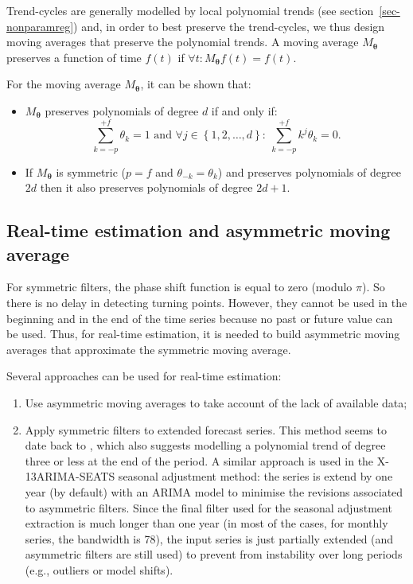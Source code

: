 \documentclass[
]{article}
\providecommand{\tightlist}{%
  \setlength{\itemsep}{0pt}\setlength{\parskip}{0pt}}\usepackage{longtable,booktabs,array}
\newcommand\1{\mathds{1}}
\begin{document}
Trend-cycles are generally modelled by local polynomial trends (see
section~\ref{sec-nonparamreg}) and, in order to best preserve the
trend-cycles, we thus design moving averages that preserve the
polynomial trends. A moving average \(M_{\boldsymbol\theta}\) preserves
a function of time \(f(t)\) if
\(\forall t:M_{\boldsymbol\theta} f(t)=f(t)\).

For the moving average \(M_{\boldsymbol\theta}\), it can be shown that:

\begin{itemize}
\tightlist
\item
  \(M_{\boldsymbol\theta}\) preserves polynomials of degree \(d\) if and
  only if: \[
  \sum_{k=-p}^{+f}\theta_k=1
   \text{ and }
  \forall j \in \left\{1,2,\dots,d\right\}:\:
  \sum_{k=-p}^{+f}k^j\theta_k=0.
  \]
\item
  If \(M_{\boldsymbol\theta}\) is symmetric (\(p=f\) and
  \(\theta_{-k} = \theta_k\)) and preserves polynomials of degree \(2d\)
  then it also preserves polynomials of degree \(2d+1\).
\end{itemize}

\subsection{Real-time estimation and asymmetric moving
average}\label{sec-mmasym}

For symmetric filters, the phase shift function is equal to zero (modulo
\(\pi\)). So there is no delay in detecting turning points. However,
they cannot be used in the beginning and in the end of the time series
because no past or future value can be used. Thus, for real-time
estimation, it is needed to build asymmetric moving averages that
approximate the symmetric moving average.

Several approaches can be used for real-time estimation:

\begin{enumerate}
\def\labelenumi{\arabic{enumi}.}
\item
  Use asymmetric moving averages to take account of the lack of
  available data;
\item
  Apply symmetric filters to extended forecast series. This method seems
  to date back to \textcite{deforest1877adjustment}, which also suggests
  modelling a polynomial trend of degree three or less at the end of the
  period. A similar approach is used in the X-13ARIMA-SEATS seasonal
  adjustment method: the series is extend by one year (by default) with
  an ARIMA model to minimise the revisions associated to asymmetric
  filters. Since the final filter used for the seasonal adjustment
  extraction is much longer than one year (in most of the cases, for
  monthly series, the bandwidth is 78), the input series is just
  partially extended (and asymmetric filters are still used) to prevent
  from instability over long periods (e.g., outliers or model shifts).
\end{enumerate}
\end{document}
